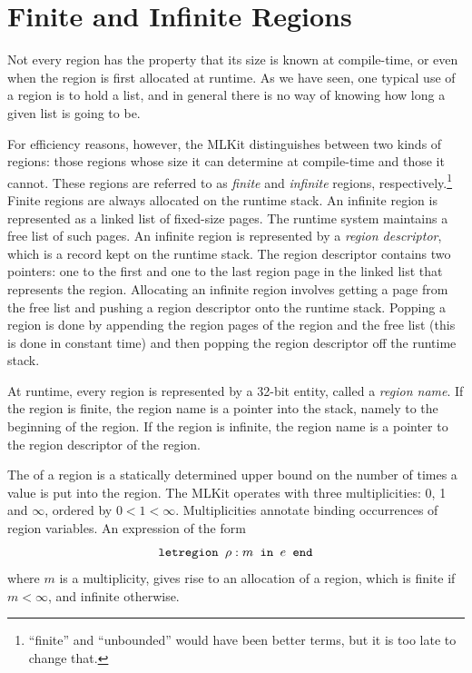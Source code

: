 \documentclass[12pt]{book}
\begin{document}
\section{Finite and Infinite Regions}
\label{fininf.sec}
Not every region has the property that its size is known at
compile-time, or even when the region is first allocated at runtime.
As we have seen, one typical use of a region is to hold a list, and in
general there is no way of knowing how long a given list is going to
be.


For efficiency reasons, however, the MLKit distinguishes between two
kinds of regions: those regions whose size it can determine at
compile-time and those it cannot.
%
These regions are referred to as 
%
{\em finite} and 
%
{\em infinite} regions, respectively.\footnote{``finite'' and
  ``unbounded'' would have been better terms, but it is too late to
  change that.}  Finite regions are always allocated on the
%
runtime stack.  An infinite region is represented as a linked list of
fixed-size 
%
pages.  The runtime system maintains a free list of such pages. An
infinite region is represented by a 
%
{\em region descriptor}, which is a record kept on the runtime stack.
The region descriptor contains two pointers: one to the first and one
to the last region page in the linked list that represents the region.
Allocating an infinite region involves getting a page from the
%
free list and pushing a region descriptor onto the
runtime stack. Popping a region is done by appending the region pages
of the region and the free list (this is done in constant time) and
then popping the region descriptor off the runtime stack.

At runtime, every region is represented by a 32-bit entity, called a
%
{\em region name}. If the region is finite, the region name is a
pointer into the stack, namely to the beginning of the region. If the
region is infinite, the region name is a pointer to the region
descriptor of the region.

The  of a region is a statically
determined upper bound on the number of times a value is put into the
region. The MLKit operates with three multiplicities: 0, 1 and $\infty$,
ordered by $0<1<\infty$. Multiplicities annotate binding occurrences
of region variables. An expression of the form
$$\hbox{\tt letregion $\rho:m$ in $e$ end}$$
where $m$ is a multiplicity,
gives rise to an allocation of a region, which is finite if $m<\infty$, and
infinite otherwise.
\end{document}

